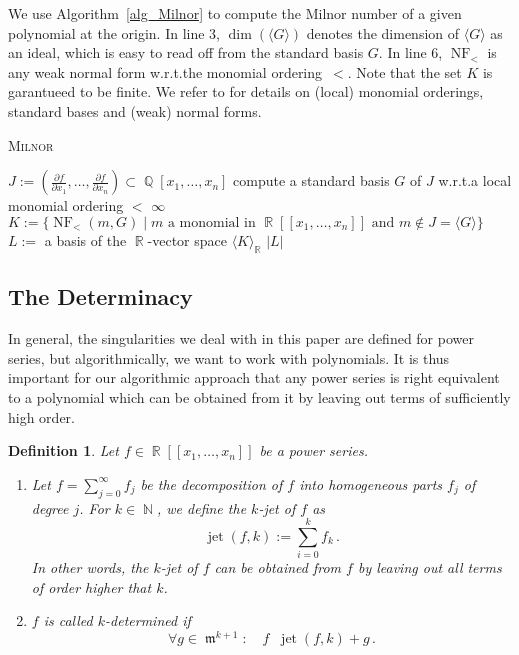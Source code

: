 \documentclass[noend]{amsproc}
\newtheorem{defn}[theorem]{Definition}
\DeclareMathOperator{\requiv}{\overset{r}{\sim}}
\DeclareMathOperator{\m}{\mathfrak{m}}
\DeclareMathOperator{\jet}{jet}
\DeclareMathOperator{\NF}{NF}
\DeclareMathOperator{\N}{\mathbb{N}}
\DeclareMathOperator{\Q}{\mathbb{Q}}
\DeclareMathOperator{\R}{\mathbb{R}}
\begin{document}
We use Algorithm~\ref{alg_Milnor} to compute the Milnor number of a given
polynomial at the origin. In line 3, $\dim(\langle G \rangle)$ denotes the
dimension of $\langle G \rangle$ as an ideal, which is easy to read off from
the standard basis $G$. In line 6, $\NF_<$ is any weak normal form w.r.t.\@ the
monomial ordering~$<$. Note that the set $K$ is garantueed to be finite. We
refer to \cite{GP2008} for details on (local) monomial orderings, standard
bases and (weak) normal forms.

\begin{algorithm}[h]
\caption{\label{alg_Milnor} \textsc{Milnor}}
\begin{algorithmic}[1]

\REQUIRE{$f \in \Q[x_1,\ldots,x_n]$}

\STATE $J := \left( \frac{\partial f}{\partial x_1}, \ldots,
\frac{\partial f}{\partial x_n} \right) \subset \Q[x_1,\ldots,x_n]$
\STATE compute a standard basis $G$ of $J$ w.r.t.\@ a local monomial ordering
$<$
\RETURN $\infty$
\ELSE
\STATE $K := \{\NF_<(m, G) \mid m \text{ a monomial in } \R[[x_1,\ldots,x_n]]
\text{ and } m \not\in J = \langle G \rangle \}$
\STATE $L :=$ a basis of the $\R$-vector space $\langle K \rangle_{\R}$
\RETURN $|L|$
\ENDIF

\end{algorithmic}
\end{algorithm}

\subsection{The Determinacy}

In general, the singularities we deal with in this paper are defined for power
series, but algorithmically, we want to work with polynomials. It is thus
important for our algorithmic approach that any power series is right
equivalent to a polynomial which can be obtained from it by leaving out terms
of sufficiently high order.

\begin{defn}
Let $f \in \R[[x_1,\ldots,x_n]]$ be a power series.

\begin{enumerate}
\item Let $f = \sum_{j=0}^\infty f_j$ be the decomposition of $f$ into
homogeneous parts $f_j$ of degree $j$.
For $k \in \N$, we define the \emph{$k$-jet} of $f$ as
\[
\jet(f,k) := \sum_{i=0}^k f_k \,.
\]
In other words, the $k$-jet of $f$ can be obtained from $f$ by leaving out all
terms of order higher that $k$.

\item $f$ is called \emph{$k$-determined} if
\[
\forall g \in \m^{k+1}: \quad f \requiv \jet(f,k)+g \,.
\]
\end{enumerate}
\end{defn}
\end{document}
